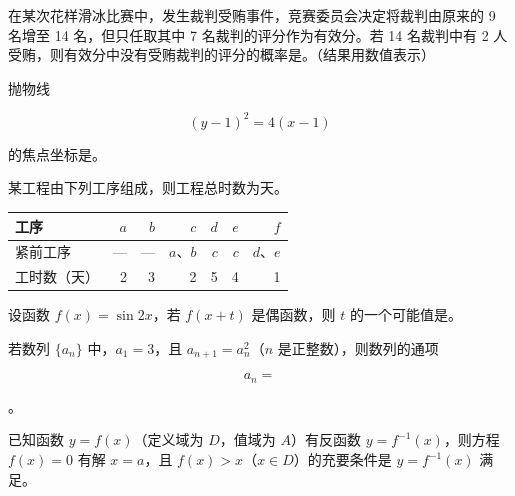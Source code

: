 \begin{question}
在某次花样滑冰比赛中，发生裁判受贿事件，竞赛委员会决定将裁判由原来的 9 名增至 14 名，但只任取其中 7 名裁判的评分作为有效分。若 14 名裁判中有 2 人受贿，则有效分中没有受贿裁判的评分的概率是\gkblank{}。（结果用数值表示）

\end{question}
\begin{question}
抛物线

\nopagebreak[4]
\[
(y-1)^2=4(x-1)
\]

的焦点坐标是\gkblank{}。

\end{question}
\begin{question}
某工程由下列工序组成，则工程总时数为\gkblank{}天。

\begin{center}
\begin{tabular}{lrrrrrr}
\toprule
工序 & $a$ & $b$ & $c$ & $d$ & $e$ & $f$ \\
\midrule
紧前工序 & — & — & $a\text{、}b$ & $c$ & $c$ & $d\text{、}e$ \\
工时数（天） & 2 & 3 & 2 & 5 & 4 & 1 \\
\bottomrule
\end{tabular}
\end{center}

\end{question}
\begin{question}
设函数 $f(x)=\sin2x$，若 $f(x+t)$ 是偶函数，则 $t$ 的一个可能值是\gkblank{}。

\end{question}
\begin{question}
若数列 $\{a_n\}$ 中，$a_1=3$，且 $a_{n+1}=a_n^2$（$n$ 是正整数），则数列的通项

\nopagebreak[4]
\[
a_n=
\]

\gkblank{}。

\end{question}
\begin{question}
已知函数 $y=f(x)$（定义域为 $D$，值域为 $A$）有反函数 $y=f^{-1}(x)$，则方程 $f(x)=0$ 有解 $x=a$，且 $f(x)>x$（$x\in D$）的充要条件是 $y=f^{-1}(x)$ 满足\gkblank{}。

\end{question}

